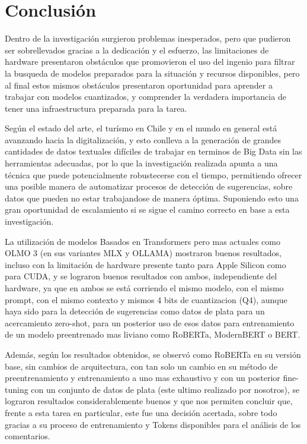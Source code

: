 \chapter{Conclusión}
\label{cha:conclusion}

Dentro de la investigación surgieron problemas inesperados, pero que pudieron ser sobrellevados gracias a la dedicación y el esfuerzo, las limitaciones de hardware presentaron obstáculos que promovieron el uso del ingenio para filtrar la busqueda de modelos preparados para la situación y recursos disponibles, pero al final estos mismos obstáculos presentaron oportunidad para aprender a trabajar con modelos cuantizados, y comprender la verdadera importancia de tener una infraestructura preparada para la tarea.

Según el estado del arte, el turísmo en Chile y en el mundo en general está avanzando hacia la digitalización, y esto conlleva a la generación de grandes cantidades de datos textuales difíciles de trabajar en terminos de Big Data sin las herramientas adecuadas, por lo que la investigación realizada apunta a una técnica que puede potencialmente robustecerse con el tiempo, permitiendo ofrecer una posible manera de automatizar procesos de detección de sugerencias, sobre datos que pueden no estar trabajandose de manera óptima. Suponiendo esto una gran oportunidad de escalamiento si se sigue el camino correcto en base a esta investigación.

La utilización de modelos Basados en Transformers pero mas actuales como OLMO 3 (en sus variantes MLX y OLLAMA) mostraron buenos resultados, incluso con la limitación de hardware presente tanto para Apple Silicon como para CUDA, y se lograron buenos resultados con ambos, independiente del hardware, ya que en ambos se está corriendo el mismo modelo, con el mismo prompt, con el mismo contexto y mismos 4 bits de cuantizacion (Q4), aunque haya sido para la detección de sugerencias como datos de plata para un acercamiento zero-shot, para un posterior uso de esos datos para entrenamiento de un modelo preentrenado mas liviano como RoBERTa, ModernBERT o BERT.

Además, según los resultados obtenidos, se observó como RoBERTa en su versión base, sin cambios de arquitectura, con tan solo un cambio en su método de preentrenamiento y entrenamiento a uno mas exhaustivo y con un posterior fine-tuning con un conjunto de datos de plata (este ultimo realizado por nosotros), se lograron resultados considerablemente buenos y que nos permiten concluir que, frente a esta tarea en particular, este fue una decisión acertada, sobre todo gracias a su proceso de entrenamiento y Tokens disponibles para el análisis de los comentarios.

